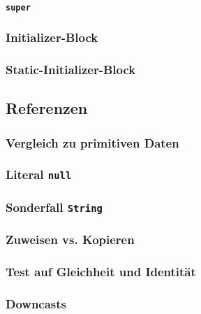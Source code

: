 		\paragraph{\texttt{super}}
	
	\subsubsection{Initializer-Block}
	
	\subsubsection{Static-Initializer-Block}

\subsection{Referenzen}
	
	\subsubsection{Vergleich zu primitiven Daten}
	
	\subsubsection{Literal \texttt{null}}
	
	\subsubsection{Sonderfall \texttt{String}}
	
	\subsubsection{Zuweisen vs. Kopieren}
	
	\subsubsection{Test auf Gleichheit und Identität}
		\label{sec:equals_identity}
	
	
	\subsubsection{Downcasts}

